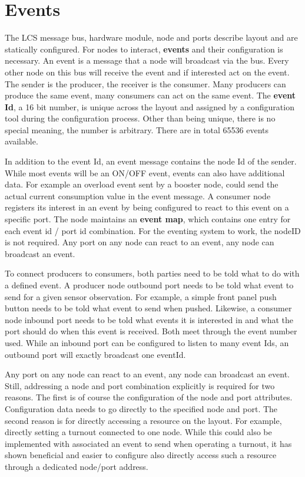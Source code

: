 \section{Events}

The LCS message bus, hardware module, node and ports describe layout and are statically configured. For nodes to interact, {\bf events} and their configuration is necessary. An event is a message that a node will broadcast via the bus. Every other node on this bus will receive the event and if interested act on the event. The sender is the producer, the receiver is the consumer. Many producers can produce the same event, many consumers can act on the same event. The {\bf event Id}, a 16 bit number, is unique across the layout and assigned by a configuration tool during the configuration process. Other than being unique, there is no special meaning, the number is arbitrary. There are in total 65536 events available.

In addition to the event Id, an event message contains the node Id of the sender. While most events will be an ON/OFF event, events can also have additional data. For example an overload event sent by a booster node, could send the actual current consumption value in the event message. A consumer node registers its interest in an event by being configured to react to this event on a specific port. The node maintains an {\bf event map}, which contains one entry for each event id / port id combination. For the eventing system to work, the nodeID is not required. Any port on any node can react to an event, any node can broadcast an event.

To connect producers to consumers, both parties need to be told what to do with a defined event. A producer node outbound port needs to be told what event to send for a given sensor observation. For example, a simple front panel push button needs to be told what event to send when pushed. Likewise, a consumer node inbound port needs to be told what events it is interested in and what the port should do when this event is received. Both meet through the event number used. While an inbound port can be configured to listen to many event Ids, an outbound port will exactly broadcast one eventId.

Any port on any node can react to an event, any node can broadcast an event. Still, addressing a node and port combination explicitly is required for two reasons. The first is of course the configuration of the node and port attributes. Configuration data needs to go directly to the specified node and port. The second reason is for directly accessing a resource on the layout. For example, directly setting a turnout connected to one node. While this could also be implemented with associated an event to send when operating a turnout, it has shown beneficial and easier to configure also directly access such a resource through a dedicated node/port address.

